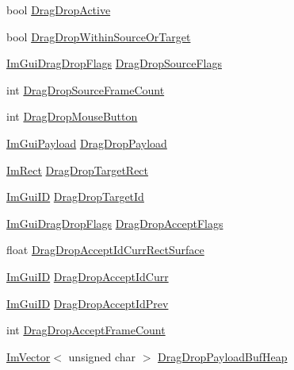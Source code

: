 \begin{DoxyCompactItemize}
bool \mbox{\hyperlink{struct_im_gui_context_a2de4fe755e10ccfee6b06aa84b3d9c0d}{Drag\+Drop\+Active}}
\item 
bool \mbox{\hyperlink{struct_im_gui_context_a9d9b14fca32e29c12cdf9a0ad83f7657}{Drag\+Drop\+Within\+Source\+Or\+Target}}
\item 
\mbox{\hyperlink{imgui_8h_a4e54f95ded29d2584125d116df22e430}{Im\+Gui\+Drag\+Drop\+Flags}} \mbox{\hyperlink{struct_im_gui_context_a61d6d8dbd670e2f4e70d50248caac012}{Drag\+Drop\+Source\+Flags}}
\item 
int \mbox{\hyperlink{struct_im_gui_context_a03bca20dc62ae39fb6c7eb047babf12c}{Drag\+Drop\+Source\+Frame\+Count}}
\item 
int \mbox{\hyperlink{struct_im_gui_context_a0efbd88ee7334cb922fccb1487ba496c}{Drag\+Drop\+Mouse\+Button}}
\item 
\mbox{\hyperlink{struct_im_gui_payload}{Im\+Gui\+Payload}} \mbox{\hyperlink{struct_im_gui_context_a35f39762769e30c083758c21fbde3e78}{Drag\+Drop\+Payload}}
\item 
\mbox{\hyperlink{struct_im_rect}{Im\+Rect}} \mbox{\hyperlink{struct_im_gui_context_a9c0b11750492d186c9b96b75d824e91b}{Drag\+Drop\+Target\+Rect}}
\item 
\mbox{\hyperlink{imgui_8h_a1785c9b6f4e16406764a85f32582236f}{Im\+Gui\+ID}} \mbox{\hyperlink{struct_im_gui_context_af8641ca16b62736c6af16364e65666ab}{Drag\+Drop\+Target\+Id}}
\item 
\mbox{\hyperlink{imgui_8h_a4e54f95ded29d2584125d116df22e430}{Im\+Gui\+Drag\+Drop\+Flags}} \mbox{\hyperlink{struct_im_gui_context_a7342ae93b69ed2c9d3ba08d184df2827}{Drag\+Drop\+Accept\+Flags}}
\item 
float \mbox{\hyperlink{struct_im_gui_context_a4a3aa38a5b88e2be8fd73b29e39e3fbc}{Drag\+Drop\+Accept\+Id\+Curr\+Rect\+Surface}}
\item 
\mbox{\hyperlink{imgui_8h_a1785c9b6f4e16406764a85f32582236f}{Im\+Gui\+ID}} \mbox{\hyperlink{struct_im_gui_context_af0ac51e2f6bd98443fe5f135f3e2ecac}{Drag\+Drop\+Accept\+Id\+Curr}}
\item 
\mbox{\hyperlink{imgui_8h_a1785c9b6f4e16406764a85f32582236f}{Im\+Gui\+ID}} \mbox{\hyperlink{struct_im_gui_context_ab835f6cb1536a4e91b6d589a100612f9}{Drag\+Drop\+Accept\+Id\+Prev}}
\item 
int \mbox{\hyperlink{struct_im_gui_context_a8163ed15c1f157390a3215dcb28feb9e}{Drag\+Drop\+Accept\+Frame\+Count}}
\item 
\mbox{\hyperlink{class_im_vector}{Im\+Vector}}$<$ unsigned char $>$ \mbox{\hyperlink{struct_im_gui_context_af4797d5b38c5c659d1aa0160d46549d8}{Drag\+Drop\+Payload\+Buf\+Heap}}

\end{DoxyCompactItemize}
